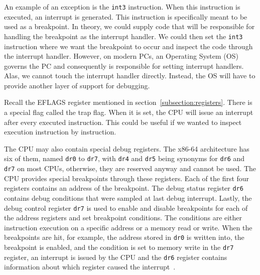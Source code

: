 An example of an exception is the \texttt{int3} instruction. When this
instruction is executed, an interrupt is generated. This instruction is
specifically meant to be used as a breakpoint. In theory, we could supply code
that will be responsible for handling the breakpoint as the interrupt handler.
We could then set the \texttt{int3} instruction where we want the breakpoint to
occur and inspect the code through the interrupt handler. However, on modern
PCs, an Operating System (OS) governs the PC and consequently is responsible
for setting interrupt handlers. Alas, we cannot touch the interrupt handler
directly. Instead, the OS will have to provide another layer of support for
debugging.

Recall the EFLAGS register mentioned in section~\ref{subsection:registers}.
There is a special flag called the trap flag. When it is set, the CPU will
issue an interrupt after every executed instruction. This could be useful if we
wanted to inspect execution instruction by instruction.

The CPU may also contain special debug registers. The x86-64 architecture has
six of them, named \texttt{dr0} to \texttt{dr7}, with \texttt{dr4} and
\texttt{dr5} being synonyms for \texttt{dr6} and \texttt{dr7} on most CPUs,
otherwise, they are reserved anyway and cannot be used. The CPU provides
special breakpoints through these registers. Each of the first four registers
contains an address of the breakpoint. The debug status register \texttt{dr6}
contains debug conditions that were sampled at last debug interrupt. Lastly,
the debug control register \texttt{dr7} is used to enable and disable
breakpoints for each of the address registers and set breakpoint conditions.
The conditions are either instruction execution on a specific address or a
memory read or write. When the breakpoints are hit, for example, the address
stored in \texttt{dr0} is written into, the breakpoint is enabled, and the
condition is set to memory write in the \texttt{dr7} register, an interrupt is
issued by the CPU and the \texttt{dr6} register contains information about
which register caused the interrupt~\cite{intel-manual}.

